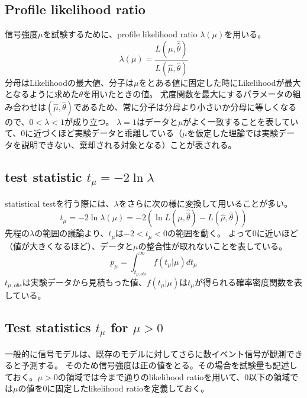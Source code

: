 \documentclass[oneside, uplatex]{jsbook}
\begin{document}
\subsection{Profile likelihood ratio}
信号強度$\mu$を試験するために、profile likelihood ratio $\lambda(\mu)$を用いる。
\begin{equation}
  \lambda(\mu) = \frac{L(\mu,\hat{\hat{\theta}})}{L(\hat{\mu},\hat{\theta})}
\end{equation}
分母はLikelihoodの最大値、分子は$\mu$をとある値に固定した時にLikelihoodが最大となるように求めた$\theta$を用いたときの値。
尤度関数を最大にするパラメータの組み合わせは$(\hat{\mu},\hat{\theta})$であるため、常に分子は分母より小さいか分母に等しくなるので、$0<\lambda<1$が成り立つ。
$\lambda=1$はデータと$\mu$がよく一致することを表していて、0に近づくほど実験データと乖離している（$\mu$を仮定した理論では実験データを説明できない、棄却される対象となる）ことが表される。

\subsection{test statistic $t_\mu=-2\ln\lambda$}
statistical testを行う際には、$\lambda$をさらに次の様に変換して用いることが多い。
\begin{equation}
  t_\mu=-2\ln\lambda(\mu) = -2 \left(\ln L(\mu,\hat{\hat{\theta}}) -  L(\hat{\mu},\hat{\theta} ) \right)
\end{equation}
先程の$\lambda$の範囲の議論より、$t_\mu$は$-2<t_\mu<0$の範囲を動く。
よって0に近いほど（値が大きくなるほど）、データと$\mu$の整合性が取れないことを表している。
\begin{equation}
p_\mu = \int_{t_{\mu,obs}} ^{\infty} f(t_\mu|\mu) dt_\mu
\end{equation}
$t_{\mu,obs}$は実験データから見積もった値、$f(t_\mu|\mu)$は$t_\mu$が得られる確率密度関数を表している。

\subsection{Test statistics $t_\mu$ for $\mu > 0$}
一般的に信号モデルは、既存のモデルに対してさらに数イベント信号が観測できると予測する。
そのため信号強度は正の値をとる。その場合を試験量も記述しておく。$\mu>0$の領域では今まで通りのlikelihood ratioを用いて、0以下の領域では$\mu$の値を0に固定したlikelihood ratioを定義しておく。
\end{document}
